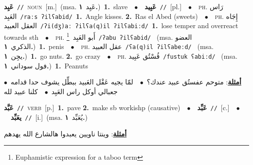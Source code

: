 \documentclass[10pt,a4paper,twoside]{article} %
\begin{document}
\begin{multicols}{2}
{\setlength\topsep{0pt}\textbf{\foreignlanguage{arabic}{عَبِد}}\ {\color{gray}\texttt{//}\color{black}}\ \textsc{noun}\ [m.]\ \color{gray}(msa. \foreignlanguage{arabic}{عَبِد}~\foreignlanguage{arabic}{\textbf{١.}})\color{black}\ \textbf{1.}~slave\ \ $\bullet$\ \ \setlength\topsep{0pt}\textbf{\foreignlanguage{arabic}{عَبِيد}}\ {\color{gray}\texttt{//}\color{black}}\ [pl.]\ \ $\bullet$\ \ \textsc{ph.} \color{gray} \foreignlanguage{arabic}{رَاس العَبِد}\color{black}\ {\color{gray}\texttt{/{\sffamily raːs ʔilʕabid}/}\color{black}}\ \textbf{1.}~Angle kisses.  \textbf{2.}~Ras el Abed (sweets)\ \ $\bullet$\ \ \textsc{ph.} \color{gray} \foreignlanguage{arabic}{إِجَاه العقل العبيد}\color{black}\ {\color{gray}\texttt{/{\sffamily ʔi(dʒ)aː ʔilʕa(q)il ʔilʕabiːd}/}\color{black}}\ \textbf{1.}~lose temper and overreact towards sth\ \ $\bullet$\ \ \textsc{ph.} \color{gray} \foreignlanguage{arabic}{أَبو العَبِد}\color{black}\ \footnote{Euphamistic expression for a taboo term}\ {\color{gray}\texttt{/{\sffamily ʔabu ʔilʕabid}/}\color{black}}\ \color{gray} (msa. \foreignlanguage{arabic}{العضو الذكري}~\foreignlanguage{arabic}{\textbf{١.}})\color{black}\ \textbf{1.}~penis\ \ $\bullet$\ \ \textsc{ph.} \color{gray} \foreignlanguage{arabic}{عقل العبيد}\color{black}\ {\color{gray}\texttt{/{\sffamily ʕa(q)il ʔilʕabeːd}/}\color{black}}\ \color{gray} (msa. \foreignlanguage{arabic}{يجِن}~\foreignlanguage{arabic}{\textbf{١.}})\color{black}\ \textbf{1.}~go nuts.  \textbf{2.}~go crazy\ \ $\bullet$\ \ \textsc{ph.} \color{gray} \foreignlanguage{arabic}{فُسْتُق عَبِيد}\color{black}\ {\color{gray}\texttt{/{\sffamily fustuk ʕabiːd}/}\color{black}}\ \color{gray} (msa. \foreignlanguage{arabic}{فول سوداني}~\foreignlanguage{arabic}{\textbf{١.}})\color{black}\ \textbf{1.}~Peanuts\  \begin{flushright}\color{gray}\foreignlanguage{arabic}{\textbf{\underline{\foreignlanguage{arabic}{أمثلة}}}: متوحم عفستُق عبيد عندك؟\ $\bullet$\ \  لمّا يجيه عَقْل العَبيد ببطِّل يشوف حدا قدامه\ $\bullet$\ \  جعبالي أوكل راس العَبِد\ $\bullet$\ \  كلنا عبيد لله}\end{flushright}\color{black}} \vspace{2mm}

{\setlength\topsep{0pt}\textbf{\foreignlanguage{arabic}{عَبَّد}}\ {\color{gray}\texttt{//}\color{black}}\ \textsc{verb}\ [p.]\ \textbf{1.}~pave  \textbf{2.}~make sb workishp (causative)\ \ $\bullet$\ \ \setlength\topsep{0pt}\textbf{\foreignlanguage{arabic}{عَبِّد}}\ {\color{gray}\texttt{//}\color{black}}\ [c.]\ \ $\bullet$\ \ \setlength\topsep{0pt}\textbf{\foreignlanguage{arabic}{يعَبِّد}}\ {\color{gray}\texttt{//}\color{black}}\ [i.]\ \color{gray}(msa. \foreignlanguage{arabic}{يُعَبِّد}~\foreignlanguage{arabic}{\textbf{١.}})\color{black}\  \begin{flushright}\color{gray}\foreignlanguage{arabic}{\textbf{\underline{\foreignlanguage{arabic}{أمثلة}}}: وينتا ناويين يعبدوا هالشارع الله يهدهم}\end{flushright}\color{black}} \vspace{2mm}


\end{multicols}
\end{document}
